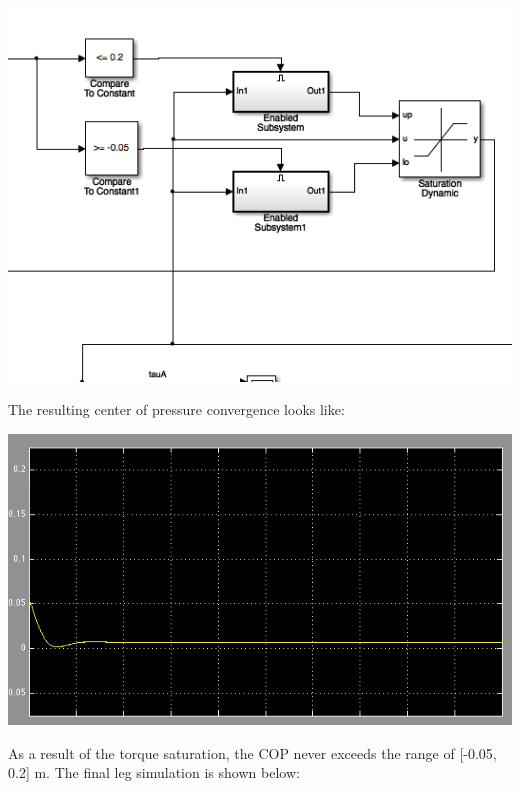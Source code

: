 \documentclass{article}
\begin{document}
\begin{center}
\includegraphics[scale=0.75]{1a_enable.png}
\end{center}

The resulting center of pressure convergence looks like:

\begin{center}
\includegraphics[scale=0.75]{1a_COP.png}
\end{center}

As a result of the torque saturation, the COP never exceeds the range of [-0.05, 0.2] m. The final leg simulation is shown below:
\end{document}
